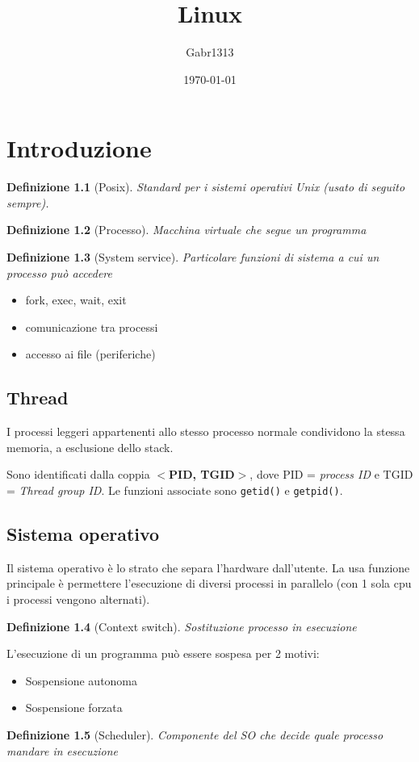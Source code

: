 \documentclass[12pt, a4paper]{report}
\title{Linux}
\author{Gabr1313}
\date{\today}
\newtheorem{definition}{Definizione}
\begin{document}
\justify
\sloppy

\maketitle
\tableofcontents

\chapter{Introduzione}
\begin{definition}[Posix]
	Standard per i sistemi operativi Unix (usato di seguito sempre).
\end{definition}
\begin{definition}[Processo]
	Macchina virtuale che segue un programma
\end{definition}
\begin{definition}[System service] Particolare funzioni di sistema a cui un
	processo può accedere
\end{definition}
\begin{itemize}
	\item fork, exec, wait, exit
	\item comunicazione tra processi
	\item accesso ai file (periferiche)
\end{itemize}
\section{Thread}
I processi leggeri appartenenti allo stesso processo normale condividono la
stessa memoria, a esclusione dello stack.

Sono identificati dalla coppia \textbf{$<$PID, TGID$>$}, dove PID =
\textit{process ID} e TGID = \textit{Thread group ID}. Le funzioni associate
sono \texttt{getid()} e \texttt{getpid()}.

\section{Sistema operativo}
Il sistema operativo è lo strato che separa l'hardware dall'utente. La usa
funzione principale è permettere l'esecuzione di diversi processi in parallelo
(con 1 sola cpu i processi vengono alternati).
\begin{definition}[Context switch]
	Sostituzione processo in esecuzione
\end{definition}
L'esecuzione di un programma può essere sospesa per 2 motivi:
\begin{itemize}
	\item Sospensione autonoma
	\item Sospensione forzata
\end{itemize}
\begin{definition}[Scheduler]
	Componente del SO che decide quale processo mandare in esecuzione
\end{definition}
\end{document}
